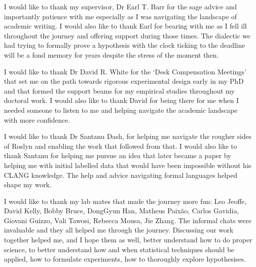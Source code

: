 \begin{acknowledgements}
I would like to thank my supervisor, Dr Earl T. Barr for the sage advice and
importantly patience with me especially as I was navigating the landscape of
academic writing. I would also like to thank Earl for bearing with me as I fell
ill throughout the journey and offering support during those times. The
dialectic we had trying to formally prove a hypothesis with the clock ticking to
the deadline will be a fond memory for years despite the stress of the moment
then.

I would like to thank Dr David R. White for the `Desk Compensation Meetings'
that set me on the path towards rigorous experimental design early in my PhD and
that formed the support beams for my empirical studies throughout my doctoral
work. I would also like to thank David for being there for me when I needed
someone to listen to me and helping navigate the academic landscape with more
confidence.

I would like to thank Dr Santanu Dash, for helping me navigate the rougher sides
of Roslyn and enabling the work that followed from that. I would also like to
thank Santanu for helping me pursue an idea that later became a paper by helping
me with initial labelled data that would have been impossible without his CLANG
knowledge. The help and advice navigating formal languages helped shape my work.

I would like to thank my lab mates that made the journey more fun: Leo Jeoffe,
David Kelly, Bobby Bruce, DongGyun Han, Matheus Paix\~ao, Carlos Gavidia,
Giovani Guizzo, Vali Tawosi, Rebecca Mousa, Jie Zhang. The informal chats were
invaluable and they all helped me through the journey. Discussing our work
together helped me, and I hope them as well, better understand how to do proper
science, to better understand how and when statistical techniques should be
applied, how to formulate experiments, how to thoroughly explore hypothesises.



\end{acknowledgements}

\setcounter{tocdepth}{2} 

\tableofcontents
\listoffigures
\listoftables
{}

